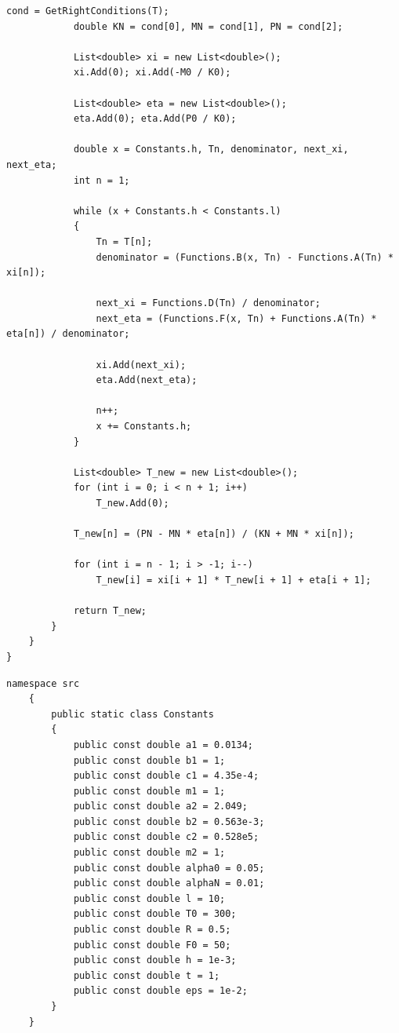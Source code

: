 \documentclass[a4paper,oneside,12pt]{extreport}
\begin{document}
\begin{lstlisting}[]
			cond = GetRightConditions(T);
			double KN = cond[0], MN = cond[1], PN = cond[2];

			List<double> xi = new List<double>();
			xi.Add(0); xi.Add(-M0 / K0);

			List<double> eta = new List<double>();
			eta.Add(0); eta.Add(P0 / K0);

			double x = Constants.h, Tn, denominator, next_xi, next_eta;
			int n = 1;

			while (x + Constants.h < Constants.l)
			{
				Tn = T[n];
				denominator = (Functions.B(x, Tn) - Functions.A(Tn) * xi[n]);

				next_xi = Functions.D(Tn) / denominator;
				next_eta = (Functions.F(x, Tn) + Functions.A(Tn) * eta[n]) / denominator;

				xi.Add(next_xi);
				eta.Add(next_eta);

				n++;
				x += Constants.h;
			} 

			List<double> T_new = new List<double>();
			for (int i = 0; i < n + 1; i++)
				T_new.Add(0);
			
			T_new[n] = (PN - MN * eta[n]) / (KN + MN * xi[n]);
			
			for (int i = n - 1; i > -1; i--)
				T_new[i] = xi[i + 1] * T_new[i + 1] + eta[i + 1];

			return T_new;
		}
	}
}
\end{lstlisting}

\begin{lstlisting}[]
	namespace src
	{
		public static class Constants
		{
			public const double a1 = 0.0134;
			public const double b1 = 1;
			public const double c1 = 4.35e-4;
			public const double m1 = 1;
			public const double a2 = 2.049;
			public const double b2 = 0.563e-3;
			public const double c2 = 0.528e5;
			public const double m2 = 1;
			public const double alpha0 = 0.05;
			public const double alphaN = 0.01;
			public const double l = 10;
			public const double T0 = 300;
			public const double R = 0.5;
			public const double F0 = 50;
			public const double h = 1e-3;
			public const double t = 1;
			public const double eps = 1e-2;
		}
	}
	\end{lstlisting}
\end{document}
